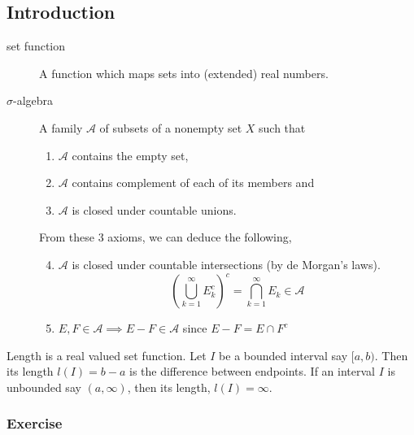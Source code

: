 \subsection{Introduction}
\begin{description}
	\item[set function] A function which maps sets into (extended) real numbers.
	\item[$\sigma$-algebra] A family $\mathcal{A}$ of subsets of a nonempty set $X$ such that
	\begin{enumerate}
		\item $\mathcal{A}$ contains the empty set, 
		\item $\mathcal{A}$ contains complement of each of its members and
		\item $\mathcal{A}$ is closed under countable unions.
	\end{enumerate}
	
	From these 3 axioms, we can deduce the following,
	\begin{enumerate}
		\setcounter{enumi}{3}
		\item $\mathcal{A}$ is closed under countable intersections (by de Morgan's laws).
			$$\left( \bigcup_{k = 1}^\infty E_k^c \right)^c = \bigcap_{k=1}^\infty E_k \in \mathcal{A}$$
		\item $E,F \in \mathcal{A} \implies E-F \in \mathcal{A}$ since $E-F = E \cap F^c$
	\end{enumerate}
\end{description}

\begin{definition}
	Length is a real valued set function.
	Let $I$ be a bounded interval say $[a,b)$.
	Then its length $l(I)=b-a$ is the difference between endpoints.
	If an interval $I$ is unbounded say $(a,\infty)$, then its length, $l(I) = \infty$.
\end{definition}

\subsubsection{Exercise}
